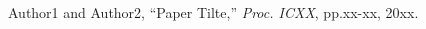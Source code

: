 \begin{thebibliography}{99}

Author1 and Author2, %
``Paper Tilte,''
{\it Proc. ICXX}, pp.xx-xx, 20xx.

\end{thebibliography}




